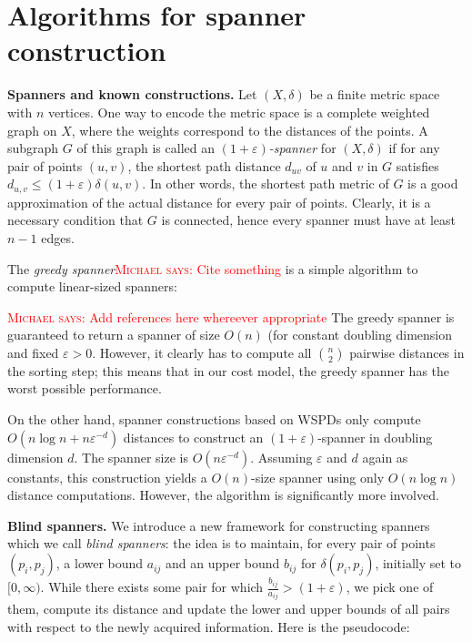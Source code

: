 \documentclass[a4paper,USenglish]{socg-lipics-v2018}
\newcommand{\eps}{\varepsilon}
\newcommand{\dist}{\delta}
\newcommand{\myparagraph}[1]{\textbf{#1.}}
\def\marrow{\marginpar[\hfill$\longrightarrow$]{$\longleftarrow$}}
\def\michael#1{\textcolor{red}{\textsc{Michael says: }{\marrow\sf #1}}}
\begin{document}
\section{Algorithms for spanner construction}

\myparagraph{Spanners and known constructions}
%
Let $(X, \dist)$ be a finite metric space with $n$ vertices. 
One way to encode the metric space is a complete weighted graph on $X$,
where the weights correspond to the distances of the points.
A subgraph $G$ of this graph is called an \emph{$(1+\eps)$-spanner} for $(X,\dist)$ 
if for any pair of points $(u,v)$,
the shortest path distance $d_{uv}$ of $u$ and $v$ in $G$ satisfies $d_{u,v}\leq (1+\eps)\dist(u,v)$.
In other words, the shortest path metric of $G$ is a good approximation of the actual distance for every pair of points.
Clearly, it is a necessary condition that $G$ is connected, hence every spanner must have at least $n-1$ edges.

The \emph{greedy spanner}\michael{Cite something} is a simple algorithm to compute linear-sized spanners:
\begin{algorithmic}
\label{alg:greedy_spanner}
\Function{GreedySpanner}{$P, \eps$}
    \If{$d_{ij}>(1+\eps)\dist(p_i,p_j)$}
    \EndIf
    \EndFor
\EndFunction
\end{algorithmic}

\michael{Add references here whereever appropriate}
The greedy spanner is guaranteed to return a spanner of size $O(n)$
(for constant doubling dimension and fixed $\eps>0$. However, it clearly
has to compute all $\binom{n}{2}$ pairwise distances in the sorting step;
this means that in our cost model, the greedy spanner has the worst possible
performance.

On the other hand, spanner constructions based on WSPDs only compute
$O(n\log n+n \eps^{-d})$ distances 
to construct an $(1+\eps)$-spanner in doubling dimension $d$.
The spanner size is $O(n\eps^{-d})$. Assuming $\eps$ and $d$ again as constants,
this construction yields a $O(n)$-size spanner using only $O(n\log n)$ distance
computations. However, the algorithm is significantly more involved.

\myparagraph{Blind spanners}
%
We introduce a new framework for constructing spanners
which we call \emph{blind spanners}: the idea is to maintain,
for every pair of points $(p_i,p_j)$,
a lower bound $a_{ij}$ and an upper bound $b_{ij}$ for $\dist(p_i,p_j)$,
initially set to $[0,\infty)$. While there exists some pair for which $\frac{b_{ij}}{a_{ij}}>(1+\eps)$,
we pick one of them, compute its distance and update the lower and upper bounds of
all pairs with respect to the newly acquired information. Here is the pseudocode:
\end{document}
